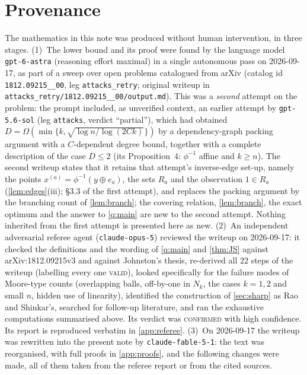 \documentclass[11pt,a4paper]{article}
\theoremstyle{plain}
\theoremstyle{definition}
\theoremstyle{remark}
\begin{document}
\section{Provenance}\label{sec:provenance}

The mathematics in this note was produced without human intervention, in three stages.
(1)~The lower bound and its proof were found by the language model \texttt{gpt-6-astra} (reasoning effort maximal) in a single autonomous pass on 2026-09-17, as part of a sweep over open problems catalogued from arXiv (catalog id \texttt{1812.09215\_\_00}, leg \texttt{attacks\_retry}; original writeup in \texttt{attacks\_retry/1812.09215\_\_00/output.md}). This was a \emph{second} attempt on the problem: the prompt included, as unverified context, an earlier attempt by \texttt{gpt-5.6-sol} (leg \texttt{attacks}, verdict ``partial''), which had obtained $D=\Omega(\min\{k,\sqrt{\log n/\log(2Ck)}\})$ by a dependency-graph packing argument with a $C$-dependent degree bound, together with a complete description of the case $D\le2$ (its Proposition~4: $\phi^{-1}$ affine and $k\ge n$). The second writeup states that it retains that attempt's inverse-edge set-up, namely the points $x^{(a)}=\phi^{-1}(y\oplus e_a)$, the sets $R_a$ and the observation $1\in R_a$ (\cref{lem:edges}(iii); \S3.3 of the first attempt), and replaces the packing argument by the branching count of \cref{lem:branch}; the covering relation, \cref{lem:branch}, the exact optimum and the answer to \cref{q:main} are new to the second attempt. Nothing inherited from the first attempt is presented here as new.
(2)~An independent adversarial referee agent (\texttt{claude-opus-5}) reviewed the writeup on 2026-09-17: it checked the definitions and the wording of \cref{q:main} and \cref{thm:JS} against arXiv:1812.09215v3 and against Johnston's thesis, re-derived all $22$ steps of the writeup (labelling every one \textsc{valid}), looked specifically for the failure modes of Moore-type counts (overlapping balls, off-by-one in $N_k$, the cases $k=1,2$ and small $n$, hidden use of linearity), identified the construction of \cref{sec:sharp} as Rao and Shinkar's, searched for follow-up literature, and ran the exhaustive computations summarised above. Its verdict was \textsc{confirmed} with high confidence. Its report is reproduced verbatim in \cref{app:referee}.
(3)~On 2026-09-17 the writeup was rewritten into the present note by \texttt{claude-fable-5-1}: the text was reorganised, with full proofs in \cref{app:proofs}, and the following changes were made, all of them taken from the referee report or from the cited sources.
\end{document}
